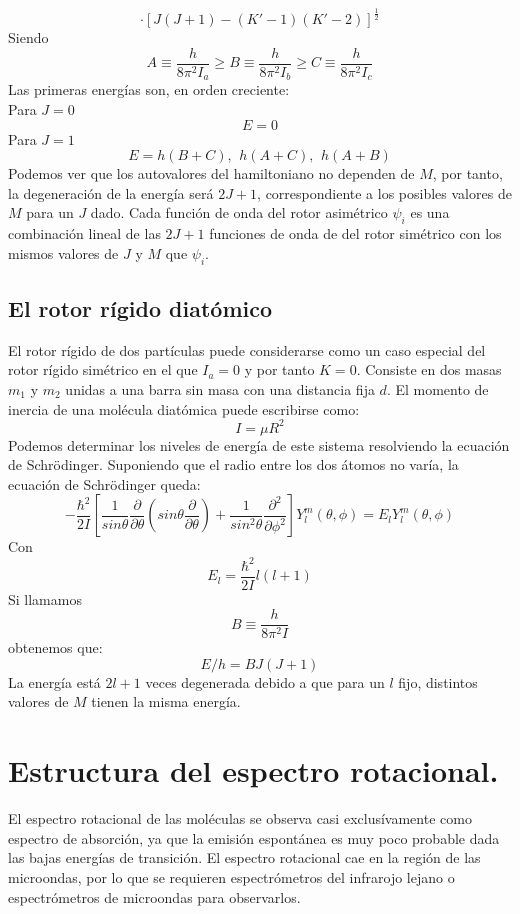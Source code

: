 \documentclass[a4paper]{article}
\begin{document}
\begin{equation}
\cdot\left[J\left(J+1\right)-\left(K'-1\right)\left(K'-2\right)\right]^\frac{1}{2}
\end{equation}
Siendo
$$
A \equiv \frac{h}{8\pi^2I_a}\geq B\equiv \frac{h}{8\pi^2I_b}\geq C\equiv \frac{h}{8\pi^2I_c}
$$
Las primeras energías son, en orden creciente:\\
Para $J = 0$
$$E = 0$$
Para $J = 1$
$$E = h(B+C), \,\ h(A+C), \,\ h(A+B)$$
Podemos ver que los autovalores del hamiltoniano no dependen de $M$, por tanto, la degeneración de la energía será $2J+1$, correspondiente a los posibles valores de $M$ para un $J$ dado.
Cada función de onda del rotor asimétrico $\psi_i$ es una combinación lineal de las $2J+1$ funciones de onda de del rotor simétrico con los mismos valores de $J$ y $M$ que $\psi_i$.
\subsection{El rotor rígido diatómico}
El rotor rígido de dos partículas puede considerarse como un caso especial del rotor rígido simétrico en el que $I_a = 0$ y por tanto $K=0$. Consiste en dos masas $m_1$ y $m_2$ unidas a una barra sin masa con una distancia fija $d$. El momento de inercia de una molécula diatómica puede escribirse como:
\begin{equation}
I=\mu R^2
\end{equation}
Podemos determinar los niveles de energía de este sistema resolviendo la ecuación de Schrödinger. Suponiendo que el radio entre los dos átomos no varía, la ecuación de Schrödinger queda:
\begin{equation}
- \frac{\hbar^2}{2I}\left[\frac{1}{sin\theta}\frac{\partial}{\partial \theta}\left(sin\theta \frac{\partial}{\partial \theta} \right) + \frac{1}{sin^2\theta}\frac{\partial^2}{\partial \phi^2}\right]Y^m_l \left(\theta,\phi \right) = E_lY^m_l \left(\theta,\phi \right)
\end{equation}
Con
$$E_l= \frac{\hbar^2}{2I}l(l+1)$$
Si llamamos $$B\equiv \frac{h}{8\pi^2I}$$
obtenemos que:
\begin{equation}
E/h=BJ(J+1)
\end{equation}
La energía está $2l+1$ veces degenerada debido a que para un $l$ fijo, distintos valores de $M$ tienen la misma energía.

\section{Estructura del espectro rotacional.}
El espectro rotacional de las moléculas se observa casi exclusívamente como espectro de absorción, ya que la emisión espontánea es muy poco probable dada las bajas energías de transición. El espectro rotacional cae en la región de las microondas, por lo que se requieren espectrómetros del infrarojo lejano o espectrómetros de microondas para observarlos.\\
\end{document}
